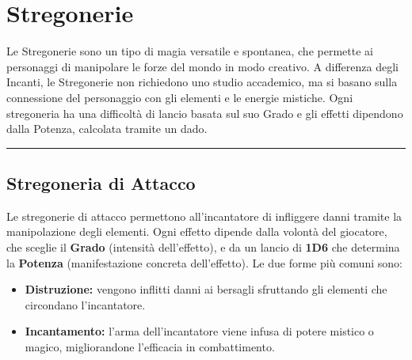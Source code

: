\documentclass[./magie.tex]{subfiles}
\begin{document}
\section{Stregonerie}

Le Stregonerie sono un tipo di magia versatile e spontanea, che permette ai personaggi di manipolare le forze del mondo in modo creativo. A differenza degli Incanti, le Stregonerie non richiedono uno studio accademico, ma si basano sulla connessione del personaggio con gli elementi e le energie mistiche. Ogni stregoneria ha una difficoltà di lancio basata sul suo Grado e gli effetti dipendono dalla Potenza, calcolata tramite un dado.
\vspace{0.2cm}
\noindent
\begin{center}
\rule{\textwidth}{0.4pt} 
\end{center}
\vspace{0.2cm}
\subsection{Stregoneria di Attacco}

Le stregonerie di attacco permettono all’incantatore di infliggere danni tramite la manipolazione degli elementi. Ogni effetto dipende dalla volontà del giocatore, che sceglie il \textbf{Grado} (intensità dell'effetto), e da un lancio di \textbf{1D6} che determina la \textbf{Potenza} (manifestazione concreta dell’effetto). Le due forme più comuni sono:
\begin{itemize}
\item \textbf{Distruzione:} vengono inflitti danni ai bersagli sfruttando gli elementi che circondano l'incantatore.
\item \textbf{Incantamento:} l'arma dell'incantatore viene infusa di potere mistico o magico, migliorandone l'efficacia in combattimento.
\end{itemize}
\end{document}
